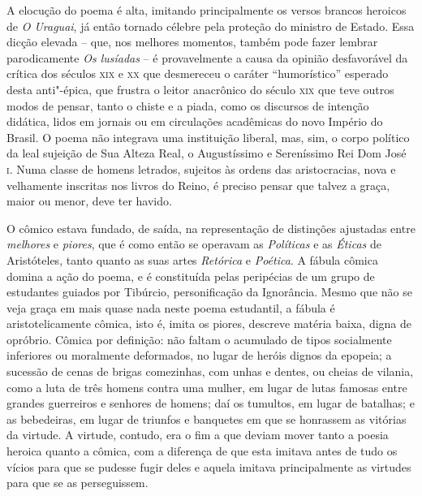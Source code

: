 A elocução do poema é alta, imitando principalmente os versos brancos heroicos
de \textit{O Uraguai}, já então tornado célebre pela proteção do ministro de
Estado.  Essa dicção elevada -- que, nos melhores momentos, também pode fazer
lembrar parodicamente \textit{Os lusíadas} -- é provavelmente a causa da opinião
desfavorável da crítica dos séculos \textsc{xix} e \textsc{xx} que desmereceu o
caráter ``humorístico'' esperado desta anti"-épica, que frustra o leitor
anacrônico do século \textsc{xix} que teve outros modos de pensar, tanto o
chiste e a piada, como os discursos de intenção didática, lidos em jornais ou em
circulações acadêmicas do novo Império do Brasil.  O poema não integrava uma
instituição liberal, mas, sim, o corpo político da leal sujeição de Sua Alteza
Real, o Augustíssimo e Sereníssimo Rei Dom José \textsc{i}.  Numa classe de
homens letrados, sujeitos às ordens das aristocracias, nova e velhamente
inscritas nos livros do Reino, é preciso pensar que talvez a graça, maior ou
menor, deve ter havido.

O cômico estava fundado, de saída, na representação de distinções ajustadas
entre \textit{melhores} e \textit{piores}, que é como então se operavam as
\textit{Políticas} e as \textit{Éticas} de Aristóteles, tanto quanto as suas
artes \textit{Retórica} e \textit{Poética}.  A fábula cômica domina a ação do
poema, e é constituída pelas peripécias de um grupo de estudantes guiados por
Tibúrcio, personificação da Ignorância.  Mesmo que não se veja graça em mais
quase nada neste poema estudantil, a fábula é aristotelicamente cômica, isto é,
imita os piores, descreve matéria baixa, digna de opróbrio. Cômica por
definição: não faltam o acumulado de tipos socialmente inferiores ou moralmente
deformados, no lugar de heróis dignos da epopeia; a sucessão de cenas de brigas
comezinhas, com unhas e dentes, ou cheias de vilania, como a luta de três homens
contra uma mulher, em lugar de lutas famosas entre grandes guerreiros e senhores
de homens; daí os tumultos, em lugar de batalhas; e as bebedeiras, em lugar de
triunfos e banquetes em que se honrassem as vitórias da virtude.  A virtude,
contudo, era o fim a que deviam mover tanto a poesia heroica quanto a cômica,
com a diferença de que esta imitava antes de tudo os vícios para que se pudesse
fugir deles e aquela imitava principalmente as virtudes para que se as
perseguissem.

